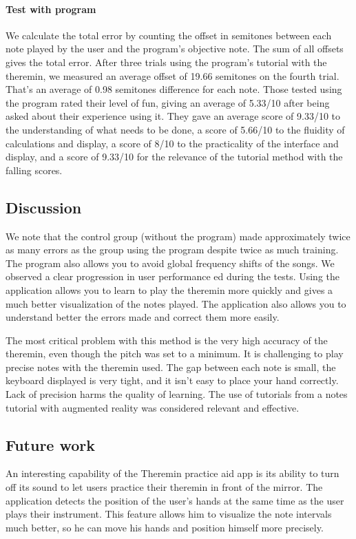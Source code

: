 \paragraph{Test with program}
We calculate the total error by counting the offset in semitones between each note played by the user and the program's objective note. The sum of all offsets gives the total error.
After three trials using the program's tutorial with the theremin, we measured an average offset of 19.66 semitones on the fourth trial. That's an average of 0.98 semitones difference for each note.
Those tested using the program rated their level of fun, giving an average of 5.33/10 after being asked about their experience using it. They gave an average score of 9.33/10 to the understanding of what needs to be done, a score of 5.66/10 to the fluidity of calculations and display, a score of 8/10 to the practicality of the interface and display, and a score of 9.33/10 for the relevance of the tutorial method with the falling scores.

\subsection{Discussion}
We note that the control group (without the program) made approximately twice as many errors as the group using the program despite twice as much training. The program also allows you to avoid global frequency shifts of the songs. We observed a clear progression in user performance ed during the tests. Using the application allows you to learn to play the theremin more quickly and gives a much better visualization of the notes played. The application also allows you to understand better the errors made and correct them more easily.

The most critical problem with this method is the very high accuracy of the theremin, even though the pitch was set to a minimum. It is challenging to play precise notes with the theremin used. The gap between each note is small, the keyboard displayed is very tight, and it isn't easy to place your hand correctly. Lack of precision harms the quality of learning. The use of tutorials from a notes tutorial with augmented reality was considered relevant and effective.

\subsection{Future work}

An interesting capability of the Theremin practice aid app is its ability to turn off its sound to let users practice their theremin in front of the mirror. The application detects the position of the user's hands at the same time as the user plays their instrument. This feature allows him to visualize the note intervals much better, so he can move his hands and position himself more precisely. 

